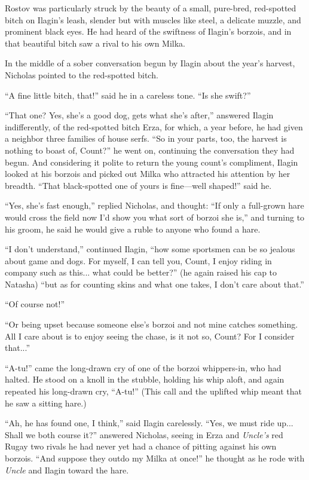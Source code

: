 Rostov was particularly struck by the beauty of a small,
pure-bred, red-spotted bitch on Ilagin's leash, slender but with
muscles like steel, a delicate muzzle, and prominent black
eyes. He had heard of the swiftness of Ilagin's borzois, and in
that beautiful bitch saw a rival to his own Milka.

In the middle of a sober conversation begun by Ilagin about the
year's harvest, Nicholas pointed to the red-spotted bitch.

``A fine little bitch, that!'' said he in a careless tone. ``Is
she swift?''

``That one? Yes, she's a good dog, gets what she's after,''
answered Ilagin indifferently, of the red-spotted bitch Erza, for
which, a year before, he had given a neighbor three families of
house serfs. ``So in your parts, too, the harvest is nothing to
boast of, Count?'' he went on, continuing the conversation they
had begun. And considering it polite to return the young count's
compliment, Ilagin looked at his borzois and picked out Milka who
attracted his attention by her breadth. ``That black-spotted one
of yours is fine---well shaped!'' said he.

``Yes, she's fast enough,'' replied Nicholas, and thought: ``If
only a full-grown hare would cross the field now I'd show you
what sort of borzoi she is,'' and turning to his groom, he said
he would give a ruble to anyone who found a hare.

``I don't understand,'' continued Ilagin, ``how some sportsmen
can be so jealous about game and dogs. For myself, I can tell
you, Count, I enjoy riding in company such as this... what could
be better?'' (he again raised his cap to Natasha) ``but as for
counting skins and what one takes, I don't care about that.''

``Of course not!''

``Or being upset because someone else's borzoi and not mine
catches something. All I care about is to enjoy seeing the chase,
is it not so, Count? For I consider that...''

``A-tu!'' came the long-drawn cry of one of the borzoi
whippers-in, who had halted. He stood on a knoll in the stubble,
holding his whip aloft, and again repeated his long-drawn cry,
``A-tu!'' (This call and the uplifted whip meant that he saw a
sitting hare.)

``Ah, he has found one, I think,'' said Ilagin carelessly. ``Yes,
we must ride up... Shall we both course it?'' answered Nicholas,
seeing in Erza and \emph{Uncle's} red Rugay two rivals he had
never yet had a chance of pitting against his own borzois. ``And
suppose they outdo my Milka at once!'' he thought as he rode with
\emph{Uncle} and Ilagin toward the hare.

